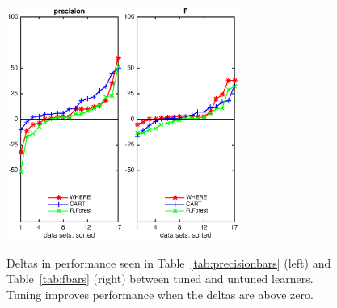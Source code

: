 \documentclass[final,twocolumn,5p]{elsarticle}
\newcommand{\tab}[1]{Table~\ref{tab:#1}}
\begin{document}
\begin{figure}[!t]
\begin{center}
\includegraphics[width=1.5in]{./eps/improvements_precision.eps}\includegraphics[width=1.5in]{./eps/improvements_F.eps}
 \end{center}
\caption{Deltas in performance  seen in \tab{precisionbars} (left)
and \tab{fbars} (right) between tuned and untuned learners. Tuning improves performance when the deltas are above zero.}\label{fig:deltas}
 \end{figure}
 
\end{document}
